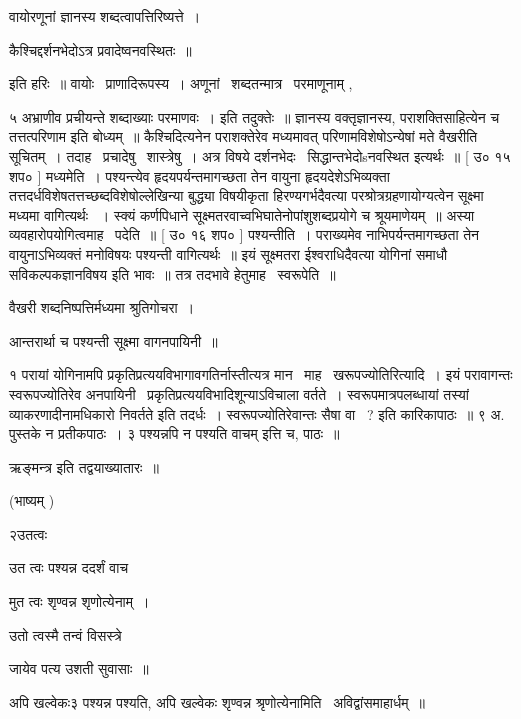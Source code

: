 \documentclass[11pt, openany]{book}
\begin{document}
वायोरणूनां ज्ञानस्य शब्दत्वापत्तिरिष्यत्ते~। 

कैश्चिद्दर्शनभेदोऽत्र प्रवादेष्वनवस्थितः~॥

 इति हरिः~॥ वायोः \textendash\ प्राणादिरूपस्य~। अणूनां \textendash\ शब्दतन्मात्र \textendash\ परमाणूनाम् , 

 {\qt ५} अभ्राणीव प्रचीयन्ते शब्दाख्याः परमाणवः~। इति तदुक्तेः~॥
ज्ञानस्य वक्तृज्ञानस्य, पराशक्तिसाहित्येन च तत्तत्परिणाम इति बोध्यम्~॥
कैश्चिदित्यनेन पराशक्तेरेव मध्यमावत् परिणामविशेषोऽन्येषां मते वैखरीति
सूचितम्~। तदाह \textendash\ प्रचादेषु \textendash\ शास्त्रेषु~। अत्र विषये
दर्शनभेदः \textendash\ सिद्धान्तभेदोsनवस्थित इत्यर्थः~॥ [ उ० १५ शप० ] मध्यमेति~। 
पश्यन्त्येव हृदयपर्यन्तमागच्छता तेन वायुना हृदयदेशेऽभिव्यक्ता
तत्तदर्धविशेषतत्तच्छब्दविशेषोल्लेखिन्या बुद्ध्या विषयीकृता
हिरण्यगर्भदैवत्या परश्रोत्रग्रहणायोग्यत्वेन सूक्ष्मा मध्यमा वागित्यर्थः
~। स्क्यं कर्णपिधाने सूक्ष्मतरवाच्वभिघातेनोपांशुशब्दप्रयोगे च
श्रूयमाणेयम्~॥ अस्या व्यवहारोपयोगित्वमाह \textendash\ पदेति~॥ [ उ० १६ शप० ]
पश्यन्तीति~। पराख्यमेव नाभिपर्यन्तमागच्छता तेन वायुनाऽभिव्यक्तं
मनोविषयः पश्यन्ती वागित्यर्थः~॥ इयं सूक्ष्मतरा ईश्वराधिदैवत्या योगिनां
समाधौ सविकल्पकज्ञानविषय इति भावः~॥ तत्र तदभावे हेतुमाह \textendash\ स्वरूपेति~॥ 

वैखरी शब्दनिष्पत्तिर्मध्यमा श्रुतिगोचरा~। 

आन्तरार्था च पश्यन्ती सूक्ष्मा वागनपायिनी~॥



१ परायां योगिनामपि प्रकृतिप्रत्ययविभागावगतिर्नास्तीत्यत्र मान \textendash\ 
माह \textendash\ खरूपज्योतिरित्यादि~। इयं परावागन्तः स्वरूपज्योतिरेव
अनपायिनी \textendash\ प्रकृतिप्रत्ययविभादिशून्याऽविचाला वर्तते~। स्वरूपमात्रपलब्धायां
तस्यां व्याकरणादीनामधिकारो निवर्तते इति तदर्धः~। {\qt स्वरूपज्योतिरेवान्तः}
सैषा वा \textendash\ ? इति कारिकापाठः~॥ ९ अ. पुस्तके न प्रतीकपाठः~। ३ {\qt पश्यन्नपि न
पश्यति वाचम्} इत्ति च, पाठः~॥ 





 ऋङ्मन्त्र इति तद्वयाख्यातारः~॥ 

 (भाष्यम् ) 

२उतत्वः \textendash\ 

उत त्वः पश्यन्न ददर्शं वाच \textendash\ 

मुत त्वः शृण्वन्न शृणोत्येनाम्~। 

उतो त्वस्मै तन्वं विसस्त्रे

जायेव पत्य उशती सुवासाः~॥

 अपि खल्वेकः३ पश्यन्न पश्यति, अपि खल्वेकः शृण्वन्न
श्रृणोत्येनामिति \textendash\ अविद्वांसमाहार्धम्~॥ 
\end{document}
